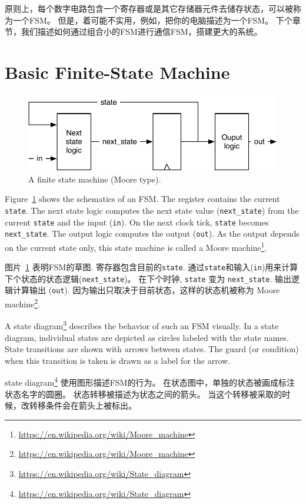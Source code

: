 \documentclass[%
    10pt,
    headinclude, footexclude,
    openright, %
    notitlepage,
    cleardoubleempty,
    headsepline,
    pointlessnumbers,
    bibtotoc, idxtotoc,
    ]{scrbook}
\newcommand{\code}[1]{{\small{\texttt{#1}}}}
\newcommand{\scale}{0.7}
\newcommand{\myref}[2]{\href{#1}{#2}}
\renewcommand{\myref}[2]{{#2}{\footnote{\url{#1}}}}
\begin{document}
原则上，每个数字电路包含一个寄存器或是其它存储器元件去储存状态，可以被称为一个FSM。
但是，着可能不实用，例如，把你的电脑描述为一个FSM。
下个章节，我们描述如何通过组合小的FSM进行通信FSM，搭建更大的系统。

\section{Basic Finite-State Machine}

\begin{figure}
  \centering
  \includegraphics[scale=\scale]{figures/fsm}
  \caption{A finite state machine (Moore type).}
  \label{fig:fsm}
\end{figure}

Figure~\ref{fig:fsm} shows the schematics of an FSM. The register contains the current \code{state}.
The next state logic computes the next state value (\code{next\_state})
from the current \code{state} and the input (\code{in}).
On the next clock tick, \code{state} becomes \code{next\_state}.
The output logic computes the output (\code{out}). As the output depends on the current
state only, this state machine is called a
\myref{https://en.wikipedia.org/wiki/Moore_machine}{Moore machine}.

图片~\ref{fig:fsm} 表明FSM的草图. 寄存器包含目前的\code{state}.
通过\code{state}和输入(\code{in})用来计算下个状态的状态逻辑(\code{next\_state})。
在下个时钟, \code{state} 变为 \code{next\_state}.
输出逻辑计算输出 (\code{out}). 因为输出只取决于目前状态，这样的状态机被称为
\myref{https://en.wikipedia.org/wiki/Moore_machine}{Moore machine}.

A \myref{https://en.wikipedia.org/wiki/State_diagram}{state diagram}
describes the behavior of such an FSM visually.
In a state diagram, individual states are depicted as circles labeled
with the state names.
State transitions are shown with arrows between states.
The guard (or condition) when this transition is taken is drawn as a label
for the arrow.

\myref{https://en.wikipedia.org/wiki/State_diagram}{state diagram}
使用图形描述FSM的行为。
在状态图中，单独的状态被画成标注状态名字的圆圈。
状态转移被描述为状态之间的箭头。
当这个转移被采取的时候，改转移条件会在箭头上被标出。
\end{document}
